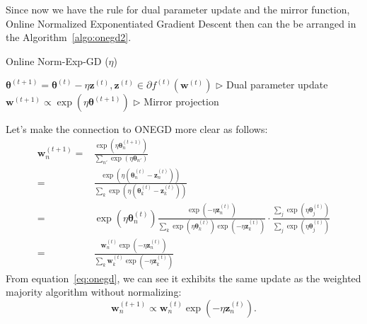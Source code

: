 \documentclass[11pt]{article}
\newcommand{\btheta}{\boldsymbol{\theta}}
\newcommand{\bz}{\boldsymbol{z}}
\newcommand{\bw}{\boldsymbol{w}}
\begin{document}
Since now we have the rule for dual parameter update and the mirror function, Online Normalized Exponentiated Gradient Descent then can the be arranged in the Algorithm~\ref{algo:onegd2}.

\begin{algorithm}[H]
\caption{Online Norm-Exp-GD ($\eta$)}
\label{algo:onegd2}
\begin{algorithmic}[1]
%
\STATE $\btheta^{(t+1)}  = \btheta^{(t)} - \eta \bz^{(t)},  \bz^{(t)} \in \partial f^{(t)}(\bw^{(t)})$ \hfill $\triangleright$ Dual parameter update
%
\STATE $\bw^{(t+1)} \propto \exp{(\eta \btheta^{(t+1)})}$ \hfill $\triangleright$ Mirror projection
%
\ENDFOR
\end{algorithmic}
\end{algorithm}

Let's make the connection to ONEGD more clear as follows:
\begin{align}\label{eq:onegd}
    \bw_n^{(t+1)} = &  \frac{\exp \left(\eta \btheta_n^{(t+1)}\right)}{\sum_{n'} \exp (\eta \btheta_{n'})} \nonumber \\
    = &  \frac{\exp \left(\eta (\btheta_n^{(t)} - \bz_n^{(t)})\right) }{\sum_{k} \exp \left( \eta (\btheta_k^{(t)} - \bz_k^{(t)}) \right)} \nonumber \\
    = & \exp (\eta \btheta_n^{(t)}) \frac{\exp (-\eta \bz_n^{(t)})}{\sum_k \exp (\eta \btheta_k^{(t)}) \exp (-\eta \bz_k^{(t)})} \cdot \frac{\sum_j \exp (\eta \btheta_j^{(t)})}{\sum_j \exp (\eta \btheta_j^{(t)})} \nonumber \\
    = & \frac{\bw_n^{(t)} \exp (-\eta \bz_n^{(t)})}{\sum_k \bw_k^{(t)} \exp (- \eta \bz_k^{(t)})}
\end{align}
%
From equation~\ref{eq:onegd}, we can see it exhibits the same update as the weighted majority algorithm without normalizing:
%
$$ \bw_n^{(t+1)} \propto \bw_n^{(t)} \exp (-\eta \bz_n^{(t)}).$$
\end{document}
